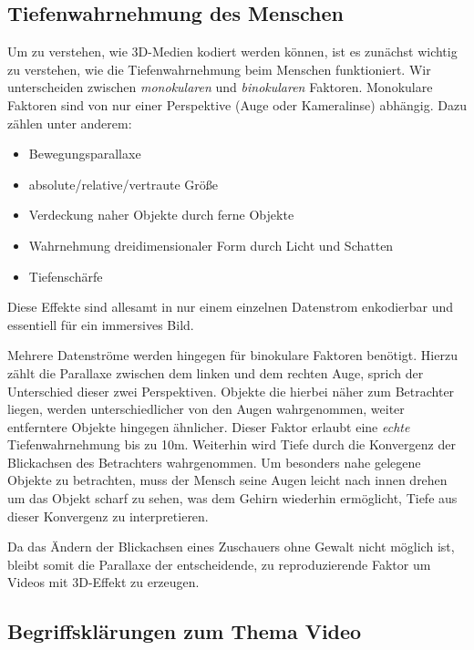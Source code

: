 \subsection{Tiefenwahrnehmung des Menschen}\label{subsec:depth-percept}
Um zu verstehen, wie 3D-Medien kodiert werden k\"onnen, ist es zun\"achst wichtig zu verstehen, wie die Tiefenwahrnehmung
beim Menschen funktioniert.
Wir unterscheiden zwischen \textit{monokularen} und \textit{binokularen} Faktoren.
Monokulare Faktoren sind von nur einer Perspektive (Auge oder Kameralinse) abh\"angig.
Dazu z\"ahlen unter anderem\cite{depth-perception}:
\begin{itemize}
    \item Bewegungsparallaxe
    \item absolute/relative/vertraute Gr\"oße
    \item Verdeckung naher Objekte durch ferne Objekte
    \item Wahrnehmung dreidimensionaler Form durch Licht und Schatten
    \item Tiefensch\"arfe
\end{itemize}
Diese Effekte sind allesamt in nur einem einzelnen Datenstrom enkodierbar und essentiell f\"ur ein immersives Bild.

\noindent\newline Mehrere Datenstr\"ome werden hingegen f\"ur binokulare Faktoren ben\"otigt.
Hierzu z\"ahlt die Parallaxe zwischen dem linken und dem rechten Auge, sprich der Unterschied dieser zwei Perspektiven.
Objekte die hierbei n\"aher zum Betrachter liegen, werden unterschiedlicher von den Augen wahrgenommen, weiter entferntere
Objekte hingegen \"ahnlicher.
Dieser Faktor erlaubt eine \textit{echte} Tiefenwahrnehmung bis zu 10m.\cite{depth-perception}
Weiterhin wird Tiefe durch die Konvergenz der Blickachsen des Betrachters wahrgenommen.
Um besonders nahe gelegene Objekte zu betrachten, muss der Mensch seine Augen leicht nach innen drehen um das Objekt
scharf zu sehen, was dem Gehirn wiederhin erm\"oglicht, Tiefe aus dieser Konvergenz zu interpretieren.

\noindent\newline Da das \"Andern der Blickachsen eines Zuschauers ohne Gewalt nicht m\"oglich ist, bleibt somit die
Parallaxe der entscheidende, zu reproduzierende Faktor um Videos mit 3D-Effekt zu erzeugen.


\subsection{Begriffskl\"arungen zum Thema Video}\label{subsec:video-terms}
